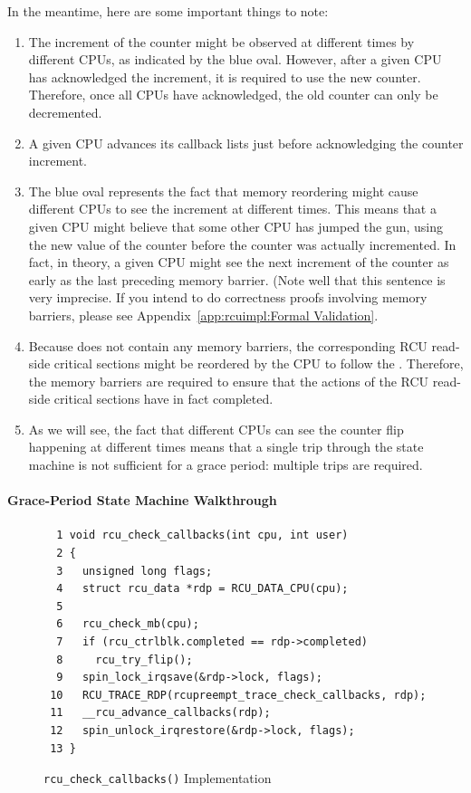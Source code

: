 In the meantime, here are some important things to note:

\begin{enumerate}
\item	The increment of the  counter
	might be observed at different times by different CPUs, as
	indicated by the blue oval.  However, after a given
	CPU has acknowledged the increment, it is required to
	use the new counter.
	Therefore, once all CPUs have acknowledged, the old counter
	can only be decremented.
\item	A given CPU advances its callback lists just before
	acknowledging the counter increment.
\item	The blue oval represents the fact that memory reordering
	might cause different CPUs to see the increment at
	different times.
	This means that a given CPU might believe that some
	other CPU has jumped the gun, using the new value of the counter
	before the counter was actually incremented.
	In fact, in theory, a given CPU might see the next increment of the
	 counter as early as
	the last preceding memory barrier.
	(Note well that this sentence is very imprecise.
	If you intend to do correctness proofs involving memory barriers,
	please see Appendix~\ref{app:rcuimpl:Formal Validation}.
\item	Because  does not contain any
	memory barriers, the corresponding RCU read-side critical
	sections might be reordered by the CPU to follow the
	.
	Therefore, the memory barriers are required to ensure
	that the actions of the RCU read-side critical sections
	have in fact completed.
\item	As we will see, the fact that different CPUs can see the
	counter flip happening at different times means that a
	single trip through the state machine is not sufficient
	for a grace period: multiple trips are required.
\end{enumerate}

\paragraph{Grace-Period State Machine Walkthrough}
\label{app:rcuimpl:Grace-Period State Machine Walkthrough}

\begin{figure}[tbp]
{ \scriptsize
\begin{verbatim}
  1 void rcu_check_callbacks(int cpu, int user)
  2 {
  3   unsigned long flags;
  4   struct rcu_data *rdp = RCU_DATA_CPU(cpu);
  5
  6   rcu_check_mb(cpu);
  7   if (rcu_ctrlblk.completed == rdp->completed)
  8     rcu_try_flip();
  9   spin_lock_irqsave(&rdp->lock, flags);
 10   RCU_TRACE_RDP(rcupreempt_trace_check_callbacks, rdp);
 11   __rcu_advance_callbacks(rdp);
 12   spin_unlock_irqrestore(&rdp->lock, flags);
 13 }
\end{verbatim}
}
\caption{{\tt rcu\_check\_callbacks()} Implementation}
\label{fig:app:rcuimpl:rcu_check_callbacks() Implementation}
\end{figure}

